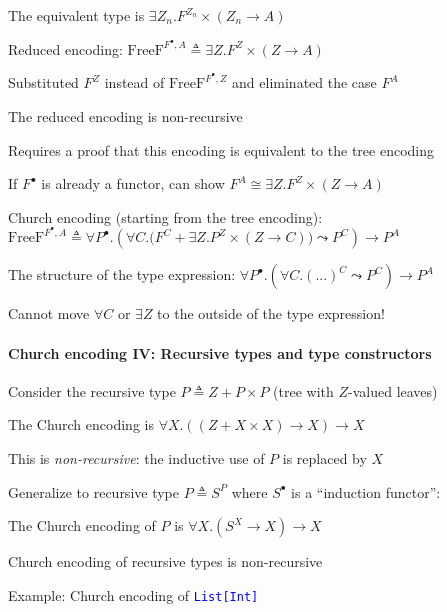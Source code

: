 The equivalent type is $\exists Z_{n}.F^{Z_{n}}\times\left(Z_{n}\rightarrow A\right)$

Reduced encoding: $\text{FreeF}^{F^{\bullet},A}\triangleq\exists Z.F^{Z}\times\left(Z\rightarrow A\right)$

Substituted $F^{Z}$ instead of $\text{FreeF}^{F^{\bullet},Z}$ and
eliminated the case $F^{A}$

The reduced encoding is non-recursive

Requires a proof that this encoding is equivalent to the tree encoding

If $F^{\bullet}$ is already a functor, can show $F^{A}\cong\exists Z.F^{Z}\times\left(Z\rightarrow A\right)$

Church encoding (starting from the tree encoding): $\text{FreeF}^{F^{\bullet},A}\triangleq\forall P^{\bullet}.\left(\forall C.\big(F^{C}+\exists Z.P^{Z}\times\left(Z\rightarrow C\right)\big)\leadsto P^{C}\right)\rightarrow P^{A}$

The structure of the type expression: $\forall P^{\bullet}.\left(\forall C.(...)^{C}\leadsto P^{C}\right)\rightarrow P^{A}$

Cannot move $\forall C$ or $\exists Z$ to the outside of the type
expression!


\paragraph{Church encoding IV: Recursive types and type constructors}

Consider the recursive type {\footnotesize{}$P\triangleq Z+P\times P$}
(tree with $Z$-valued leaves)

The Church encoding is {\footnotesize{}$\forall X.\left(\left(Z+X\times X\right)\rightarrow X\right)\rightarrow X$}{\footnotesize\par}

This is \emph{non-recursive}: the inductive use of $P$ is replaced
by $X$

Generalize to recursive type $P\triangleq S^{P}$ where $S^{\bullet}$
is a \textsf{``}induction functor\textsf{''}:

The Church encoding of $P$ is {\footnotesize{}$\forall X.\left(S^{X}\rightarrow X\right)\rightarrow X$}{\footnotesize\par}

Church encoding of recursive types is non-recursive

Example: Church encoding of \texttt{\textcolor{blue}{\footnotesize{}List{[}Int{]}}} 


